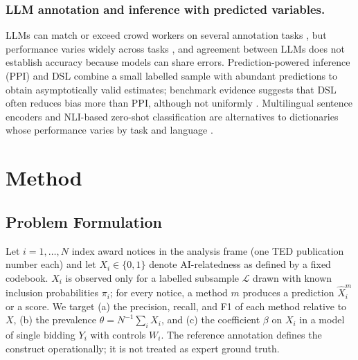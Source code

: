 \documentclass[runningheads]{llncs}
\begin{document}
\subsubsection{LLM annotation and inference with predicted variables.} LLMs can match or exceed crowd workers on several annotation tasks \cite{gilardi2023}, but performance varies widely across tasks \cite{ziems2024}, and agreement between LLMs does not establish accuracy because models can share errors. Prediction-powered inference (PPI) \cite{angelopoulos2023} and DSL \cite{egami2023} combine a small labelled sample with abundant predictions to obtain asymptotically valid estimates; benchmark evidence suggests that DSL often reduces bias more than PPI, although not uniformly \cite{audinet2025}. Multilingual sentence encoders \cite{wang2024me5,reimers2020} and NLI-based zero-shot classification \cite{yin2019,he2023} are alternatives to dictionaries whose performance varies by task and language \cite{muennighoff2023}.

\section{Method}
\subsection{Problem Formulation}
Let $i=1,\dots,N$ index award notices in the analysis frame (one TED publication number each) and let $X_i\in\{0,1\}$ denote AI-relatedness as defined by a fixed codebook. $X_i$ is observed only for a labelled subsample $\mathcal{L}$ drawn with known inclusion probabilities $\pi_i$; for every notice, a method $m$ produces a prediction $\hat{X}^m_i$ or a score. We target (a) the precision, recall, and F1 of each method relative to $X$, (b) the prevalence $\theta=N^{-1}\sum_i X_i$, and (c) the coefficient $\beta$ on $X_i$ in a model of single bidding $Y_i$ with controls $W_i$. The reference annotation defines the construct operationally; it is not treated as expert ground truth.
\end{document}
